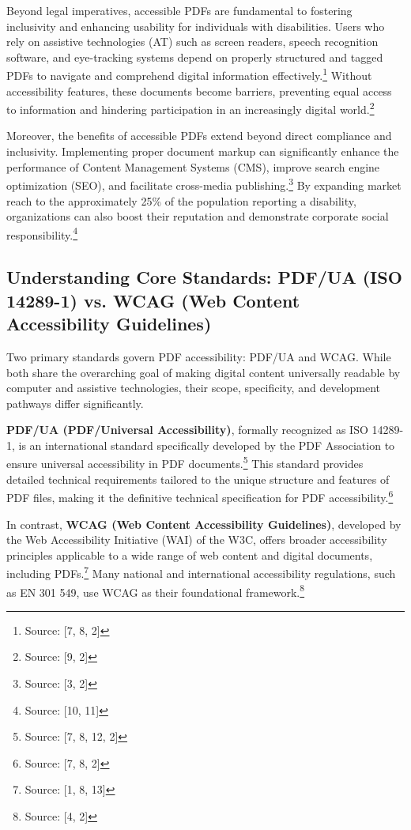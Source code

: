 Beyond legal imperatives, accessible PDFs are fundamental to fostering inclusivity and enhancing usability for individuals with disabilities. Users who rely on assistive technologies (AT) such as screen readers, speech recognition software, and eye-tracking systems depend on properly structured and tagged PDFs to navigate and comprehend digital information effectively.\footnote{Source: [7, 8, 2]} Without accessibility features, these documents become barriers, preventing equal access to information and hindering participation in an increasingly digital world.\footnote{Source: [9, 2]}

Moreover, the benefits of accessible PDFs extend beyond direct compliance and inclusivity. Implementing proper document markup can significantly enhance the performance of Content Management Systems (CMS), improve search engine optimization (SEO), and facilitate cross-media publishing.\footnote{Source: [3, 2]} By expanding market reach to the approximately 25\% of the population reporting a disability, organizations can also boost their reputation and demonstrate corporate social responsibility.\footnote{Source: [10, 11]}

\subsection{Understanding Core Standards: PDF/UA (ISO 14289-1) vs. WCAG (Web Content Accessibility Guidelines)}

Two primary standards govern PDF accessibility: PDF/UA and WCAG. While both share the overarching goal of making digital content universally readable by computer and assistive technologies, their scope, specificity, and development pathways differ significantly.

\textbf{PDF/UA (PDF/Universal Accessibility)}, formally recognized as ISO 14289-1, is an international standard specifically developed by the PDF Association to ensure universal accessibility in PDF documents.\footnote{Source: [7, 8, 12, 2]} This standard provides detailed technical requirements tailored to the unique structure and features of PDF files, making it the definitive technical specification for PDF accessibility.\footnote{Source: [7, 8, 2]}

In contrast, \textbf{WCAG (Web Content Accessibility Guidelines)}, developed by the Web Accessibility Initiative (WAI) of the W3C, offers broader accessibility principles applicable to a wide range of web content and digital documents, including PDFs.\footnote{Source: [1, 8, 13]} Many national and international accessibility regulations, such as EN 301 549, use WCAG as their foundational framework.\footnote{Source: [4, 2]}

